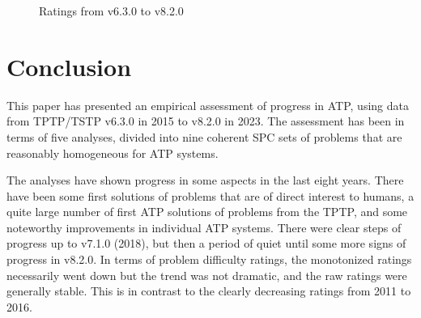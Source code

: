 \documentclass[runningheads]{llncs}
\begin{document}
\begin{figure}[t!]
\begin{minipage}[t]{.49\textwidth}
  \vspace*{-2em}
  \caption{Ratings from v6.3.0 to v8.2.0}
  \label{Ratings_v6.3.0_v8.2.0}
\end{minipage}
\end{figure}

\section{Conclusion}
\label{Conclusion}

This paper has presented an empirical assessment of progress in ATP, using data from TPTP/TSTP
v6.3.0 in 2015 to v8.2.0 in 2023.
The assessment has been in terms of five analyses, divided into nine coherent SPC sets of problems
that are reasonably homogeneous for ATP systems.

The analyses have shown progress in some aspects in the last eight years.
There have been some first solutions of problems that are of direct interest to humans, 
a quite large number of first ATP solutions of problems from the TPTP, and 
some noteworthy improvements in individual ATP systems.
There were clear steps of progress up to v7.1.0 (2018), but then a period of quiet until some
more signs of progress in v8.2.0.
In terms of problem difficulty ratings, the monotonized ratings necessarily went down but the 
trend was not dramatic, and the raw ratings were generally stable.
This is in contrast to the clearly decreasing ratings from 2011 to 2016.
\end{document}
